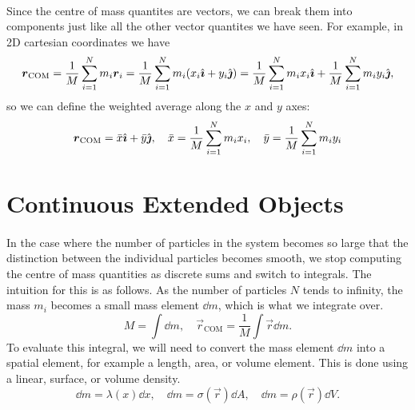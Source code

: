 \documentclass[../classical_mechanics.tex]{subfiles}
\begin{document}
        \paragraph{}
        Since the centre of mass quantites are vectors, we can break them into components just like all the other vector quantites we have seen.
        For example, in 2D cartesian coordinates we have
        \begin{equation}
            \boldsymbol{r}_\text{COM}=\frac{1}{M}\sum_{i=1}^N m_i\boldsymbol{r}_i=\frac{1}{M}\sum_{i=1}^N m_i(x_i\hat{\boldsymbol{\imath}}+y_i\hat{\boldsymbol{\jmath}})=\frac{1}{M}\sum_{i=1}^N m_ix_i\hat{\boldsymbol{\imath}}+\frac{1}{M}\sum_{i=1}^N m_iy_i\hat{\boldsymbol{\jmath}},
        \end{equation}
        so we can define the weighted average along the $x$ and $y$ axes:
        \begin{equation}
            \boldsymbol{r}_\text{COM}=\bar{x}\hat{\boldsymbol{\imath}}+\bar{y}\hat{\boldsymbol{\jmath}},\quad\bar{x}=\frac{1}{M}\sum_{i=1}^N m_ix_i,\quad\bar{y}=\frac{1}{M}\sum_{i=1}^N m_iy_i
        \end{equation}

    \section{Continuous Extended Objects}
        \paragraph{}
        In the case where the number of particles in the system becomes so large that the distinction between the individual particles becomes smooth, we stop computing the centre of mass quantities as discrete sums and switch to integrals.
        The intuition for this is as follows.
        As the number of particles $N$ tends to infinity, the mass $m_i$ becomes a small mass element $\dd{m}$, which is what we integrate over.
        \begin{equation}
            M=\int\dd{m},\quad\vec{r}_\text{COM}=\frac{1}{M}\int\vec{r}\dd{m}.
        \end{equation}
        To evaluate this integral, we will need to convert the mass element $\dd{m}$ into a spatial element, for example a length, area, or volume element.
        This is done using a linear, surface, or volume density.
        \begin{equation}
            \dd{m}=\lambda(x)\dd{x},\quad\dd{m}=\sigma(\vec{r})\dd{A},\quad\dd{m}=\rho(\vec{r})\dd{V}.
        \end{equation}
\end{document}

